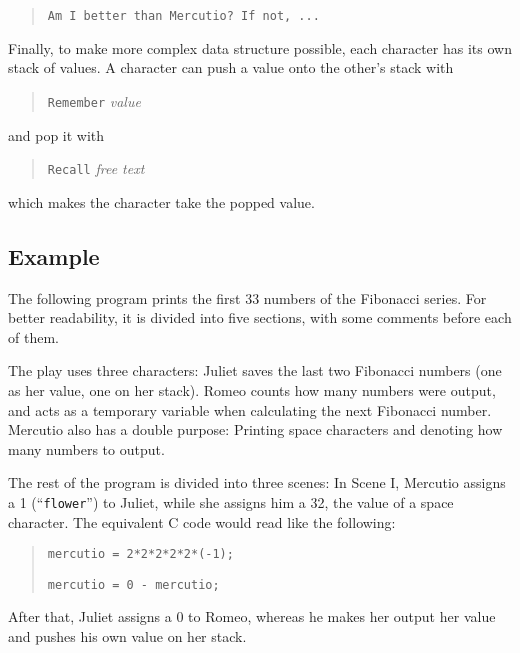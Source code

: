 \begin{quotation}
    \texttt{Am I better than Mercutio?~If not, ...}
\end{quotation}

Finally, to make more complex data structure possible, each character has its own stack of values. A character can push a value onto the other's stack with

\begin{quotation}
    \texttt{Remember} \emph{value}
\end{quotation}

and pop it with

\begin{quotation}
    \texttt{Recall} \emph{free text}
\end{quotation}

which makes the character take the popped value.

\subsection{Example}

The following program prints the first 33 numbers of the Fibonacci series. For better readability, it is divided into five sections, with some comments before each of them.

The play uses three characters: Juliet saves the last two Fibonacci numbers (one as her value, one on her stack). Romeo counts how many numbers were output, and acts as a temporary variable when calculating the next Fibonacci number. Mercutio also has a double purpose: Printing space characters and denoting how many numbers to output.



The rest of the program is divided into three scenes: In Scene I, Mercutio assigns a 1 (“\texttt{flower}”) to Juliet, while she assigns him a 32, the \ascii{} value of a space character. The equivalent C code would read like the following:

\begin{quotation}
    \texttt{mercutio = 2*2*2*2*2*(-1);}

    \texttt{mercutio = 0 - mercutio;}
\end{quotation}

After that, Juliet assigns a 0 to Romeo, whereas he makes her output her value and pushes his own value on her stack.



